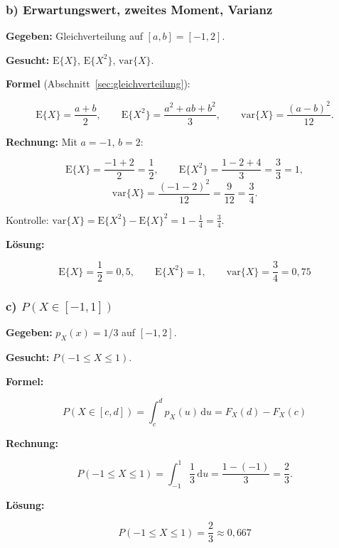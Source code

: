 \subsubsection*{b) Erwartungswert, zweites Moment, Varianz}

\begin{beispiel}

\textbf{Gegeben:} Gleichverteilung auf $[a, b] = [-1, 2]$.

\textbf{Gesucht:} $\mathrm{E}\{X\}$, $\mathrm{E}\{X^2\}$, $\mathrm{var}\{X\}$.

\textbf{Formel} (Abschnitt~\ref{sec:gleichverteilung}):

$$
\mathrm{E}\{X\} = \frac{a + b}{2}, \qquad
\mathrm{E}\{X^2\} = \frac{a^2 + ab + b^2}{3}, \qquad
\mathrm{var}\{X\} = \frac{(a - b)^2}{12}.
$$

\textbf{Rechnung:} Mit $a = -1$, $b = 2$:

$$
\mathrm{E}\{X\} = \frac{-1 + 2}{2} = \frac{1}{2}, \qquad
\mathrm{E}\{X^2\} = \frac{1 - 2 + 4}{3} = \frac{3}{3} = 1,
$$
$$
\mathrm{var}\{X\} = \frac{(-1 - 2)^2}{12} = \frac{9}{12} = \frac{3}{4}.
$$

Kontrolle: $\mathrm{var}\{X\} = \mathrm{E}\{X^2\} - \mathrm{E}\{X\}^2
= 1 - \tfrac{1}{4} = \tfrac{3}{4}$. \checkmark

\textbf{Lösung:}

$$
\boxed{\;\mathrm{E}\{X\} = \frac{1}{2} = 0{,}5, \qquad
\mathrm{E}\{X^2\} = 1, \qquad
\mathrm{var}\{X\} = \frac{3}{4} = 0{,}75\;}
$$

\end{beispiel}

\subsubsection*{c) $P(X \in [-1, 1])$}

\begin{beispiel}

\textbf{Gegeben:} $p_X(x) = 1/3$ auf $[-1, 2]$.

\textbf{Gesucht:} $P(-1 \leq X \leq 1)$.

\textbf{Formel:}

$$
P(X \in [c, d]) = \int_c^d p_X(u)\,\mathrm{d}u = F_X(d) - F_X(c)
$$

\textbf{Rechnung:}

$$
P(-1 \leq X \leq 1) = \int_{-1}^{1} \frac{1}{3}\,\mathrm{d}u
= \frac{1 - (-1)}{3} = \frac{2}{3}.
$$

\textbf{Lösung:}

$$
\boxed{\;P(-1 \leq X \leq 1) = \frac{2}{3} \approx 0{,}667\;}
$$

\end{beispiel}

